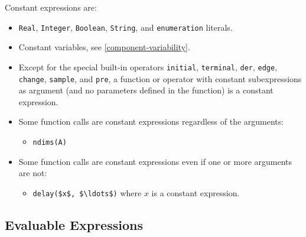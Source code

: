 Constant expressions are:
\begin{itemize}
\item
  \lstinline!Real!, \lstinline!Integer!, \lstinline!Boolean!, \lstinline!String!, and \lstinline!enumeration! literals.
\item
  Constant variables, see \cref{component-variability}.
\item
  Except for the special built-in operators \lstinline!initial!, \lstinline!terminal!, \lstinline!der!, \lstinline!edge!, \lstinline!change!, \lstinline!sample!, and \lstinline!pre!, a function or operator with constant subexpressions as argument (and no parameters defined in the function) is a constant expression.
\item
  Some function calls are constant expressions regardless of the arguments:
  \begin{itemize}
  \item
    \lstinline!ndims(A)!
  \end{itemize}
\item
  Some function calls are constant expressions even if one or more arguments are not:
  \begin{itemize}
  \item
    \lstinline!delay($x$, $\ldots$)! where $x$ is a constant expression.
  \end{itemize}
\end{itemize}

\subsection{Evaluable Expressions}\label{evaluable-expressions}

